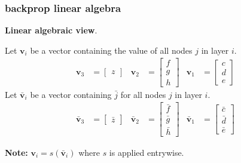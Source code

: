 \documentclass[handout,compress]{beamer}
\newcommand{\bv}[1]{\mathbf{#1}}
\begin{document}
	\begin{frame}
	\frametitle{backprop linear algebra}
	\small
	\textbf{Linear algebraic view}. 
	
	Let $\bv{v}_i$ be a vector containing the value of all nodes $j$ in layer $i$. 
	\begin{align*}
	\bv{v}_3 &= \begin{bmatrix}z\end{bmatrix} & \bv{v}_2 &= \begin{bmatrix}f\\ g\\h\end{bmatrix} & \bv{v}_1 &= \begin{bmatrix} c\\d\\ e\end{bmatrix} 
	\end{align*}
	Let $\bar{\bv{v}}_i$ be a vector containing $\bar{j}$ for all nodes $j$ in layer $i$. 
	\begin{align*}
\bar{\bv{v}}_3 &= \begin{bmatrix}\bar{z}\end{bmatrix} & \bar{\bv{v}}_2 &= \begin{bmatrix}\bar{f}\\ \bar{g}\\\bar{h}\end{bmatrix} & \bar{\bv{v}}_1 &= \begin{bmatrix} \bar{c}\\\bar{d}\\ \bar{e}\end{bmatrix} 
	\end{align*}
	
	\textbf{Note:} $\bv{v}_i = s(\bar{\bv{v}}_i)$ where $s$ is applied entrywise. 
\end{frame}
	
\end{document}

